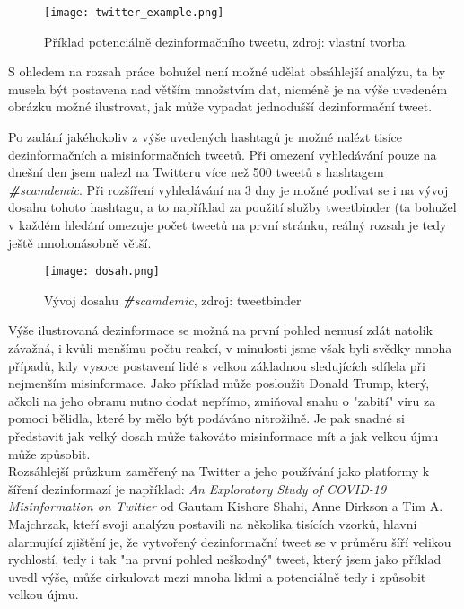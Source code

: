 \begin{figure}[htbp]
  \centering
  \texttt{[image: twitter\_example.png]}
  \caption{Příklad potenciálně dezinformačního tweetu, zdroj: vlastní tvorba}
  \label{fig:twitter example}
\end{figure}
\vspace*{-5mm}

\begin{framed}
{\small S ohledem na rozsah práce bohužel není možné udělat obsáhlejší analýzu, ta by musela být postavena nad větším množstvím dat, nicméně je na výše uvedeném obrázku možné ilustrovat, jak může vypadat jednodušší dezinformační tweet.}
\end{framed}

Po zadání jakéhokoliv z výše uvedených hashtagů je možné nalézt tisíce dezinformačních a misinformačních tweetů. Při omezení vyhledávání pouze na dnešní den jsem nalezl na Twitteru více než 500 tweetů s hashtagem \textit{\textbf{\#}scamdemic}. Při rozšíření vyhledávání na 3 dny je možné podívat se i na vývoj dosahu tohoto hashtagu, a to například za použití služby tweetbinder (ta bohužel v každém hledání omezuje počet tweetů na první stránku, reálný rozsah je tedy ještě mnohonásobně větší.\\

\begin{figure}[htbp]
  \centering
  \texttt{[image: dosah.png]}
  \caption{Vývoj dosahu \textit{\textbf{\#}scamdemic}, zdroj: tweetbinder}
  \label{fig:twitter dosah}
\end{figure}

Výše ilustrovaná dezinformace se možná na první pohled nemusí zdát natolik závažná, i kvůli menšímu počtu reakcí, v minulosti jsme však byli svědky mnoha případů, kdy vysoce postavení lidé s velkou základnou sledujících sdílela při nejmenším misinformace. Jako příklad může posloužit Donald Trump, který, ačkoli na jeho obranu nutno dodat nepřímo, zmiňoval snahu o "zabití" viru za pomoci bělidla, které by mělo být podáváno nitrožilně\cite{noauthor_coronavirus_2020}. Je pak snadné si představit jak velký dosah může takováto misinformace mít a jak velkou újmu může způsobit.\\


Rozsáhlejší průzkum zaměřený na Twitter a jeho používání jako platformy k šíření dezinformazí je například: \textit{An Exploratory Study of COVID-19 Misinformation on Twitter} od Gautam Kishore Shahi, Anne Dirkson a Tim A. Majchrzak, kteří svoji analýzu postavili na několika tisících vzorků\cite{shahi_exploratory_2020}, hlavní alarmující zjištění je, že vytvořený dezinformační tweet se v průměru šíří velikou rychlostí, tedy i tak "na první pohled neškodný" tweet, který jsem jako příklad uvedl výše, může cirkulovat mezi mnoha lidmi a potenciálně tedy i způsobit velkou újmu.\\

